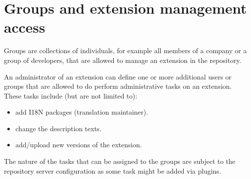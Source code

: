 \section[sec:groups]{Groups and extension management access}

Groups are collections of individuals, for example all members of a company or a group of developers, that are allowed to manage an extension in the repository.

An administrator of an extension can define one or more additional users or groups that are allowed to do perform administrative tasks on an extension.
These tasks include (but are not limited to):
\begin{itemize}
\item add I18N packages (translation maintainer).
\item change the description texts.
\item add/upload new versions of the extension.
\end{itemize}

The nature of the tasks that can be assigned to the groups are subject to the repository server configuration as some task might be added via plugins.